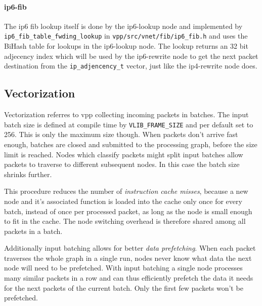 
\paragraph{ip6-fib}

The ip6 \Ac{fib} lookup itself is done by the ip6-lookup node and
implemented by \lstinline|ip6_fib_table_fwding_lookup| in
\lstinline|vpp/src/vnet/fib/ip6_fib.h| and uses the BiHash table for
lookups in the ip6-lookup node. The lookup returns an 32 bit adjecency
index which will be used by the ip6-rewrite node to get the next
packet destination from the \lstinline|ip_adjencency_t| vector, just
like the ip4-rewrite node does.



\subsection{Vectorization}
\label{sec:vectorization}


Vectorization referres to \Ac{vpp} collecting incoming packets in
batches. The input batch size is defined at compile time by
\lstinline|VLIB_FRAME_SIZE| and per default set to 256. This is only
the maximum size though. When packets don't arrive fast enough,
batches are closed and submitted to the processing graph, before the
size limit is reached. Nodes which classify packets might split input
batches allow packets to traverse to different subsequent nodes. In
this case the batch size shrinks further.

This procedure reduces the number of \textit{instruction cache misses}, because
a new node and it's associated function is loaded into the cache only
once for every batch, instead of once per processed packet, as long as
the node is small enough to fit in the cache. The node switching
overhead is therefore shared among all packets in a batch.

Additionally input batching allows for better \textit{data prefetching}. When
each packet traverses the whole graph in a single run, nodes never
know what data the next node will need to be prefetched. With input
batching a single node processes many similar packets in a row and can
thus efficiently prefetch the data it needs for the next packets of
the current batch. Only the first few packets won't be prefetched.

